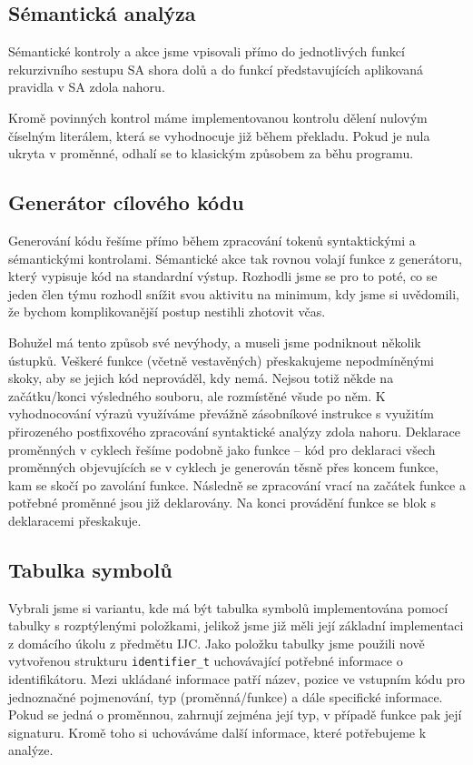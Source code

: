 \documentclass[11pt,a4paper]{article}
\begin{document}
    \subsection{Sémantická analýza}
    Sémantické kontroly a akce jsme vpisovali přímo do jednotlivých funkcí rekurzivního sestupu SA shora dolů a do funkcí představujících aplikovaná pravidla v SA zdola nahoru.
    
    Kromě povinných kontrol máme implementovanou kontrolu dělení nulovým číselným literálem, která se vyhodnocuje již během překladu. Pokud je nula ukryta v proměnné, odhalí se to klasickým způsobem za běhu programu.
    
    \subsection{Generátor cílového kódu}
    Generování kódu řešíme přímo během zpracování tokenů syntaktickými a sémantickými kontrolami. Sémantické akce tak rovnou volají funkce z generátoru, který vypisuje kód na standardní výstup. Rozhodli jsme se pro to poté, co se jeden člen týmu rozhodl snížit svou aktivitu na minimum, kdy jsme si uvědomili, že bychom komplikovanější postup nestihli zhotovit včas.
    
    Bohužel má tento způsob své nevýhody, a museli jsme podniknout několik ústupků. Veškeré funkce (včetně vestavěných) přeskakujeme nepodmíněnými skoky, aby se jejich kód neprováděl, kdy nemá. Nejsou totiž někde na začátku/konci výsledného souboru, ale rozmístěné všude po něm. K vyhodnocování výrazů využíváme převážně zásobníkové instrukce s využitím přirozeného postfixového zpracování syntaktické analýzy zdola nahoru. Deklarace proměnných v cyklech řešíme podobně jako funkce -- kód pro deklaraci všech proměnných objevujících se v cyklech je generován těsně přes koncem funkce, kam se skočí po zavolání funkce. Následně se zpracování vrací na začátek funkce a potřebné proměnné jsou již deklarovány. Na konci provádění funkce se blok s deklaracemi přeskakuje.
    
    \subsection{Tabulka symbolů}
    \label{sec:symtable}
    
    Vybrali jsme si variantu, kde má být tabulka symbolů implementována pomocí tabulky s rozptýlenými položkami, jelikož jsme již měli její základní implementaci z domácího úkolu z předmětu IJC. Jako položku tabulky jsme použili nově vytvořenou strukturu \texttt{identifier\_t} uchovávající potřebné informace o identifikátoru. Mezi ukládané informace patří název, pozice ve vstupním kódu pro jednoznačné pojmenování, typ (proměnná/funkce) a dále specifické informace. Pokud se jedná o proměnnou, zahrnují zejména její typ, v případě funkce pak její signaturu. Kromě toho si uchováváme další informace, které potřebujeme k analýze.
    
\end{document}
